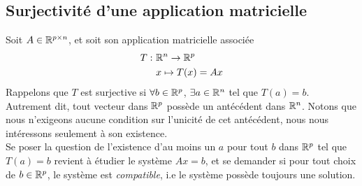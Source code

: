 \subsection{Surjectivité d'une application matricielle}
\noindent Soit $A \in \mathbb{R}^{p \times n}$, et soit son application matricielle associée
\begin{align*}
    T: \ &\mathbb{R}^n \to \mathbb{R}^p\\
    &x \mapsto T(x) = Ax
\end{align*}
Rappelons que $T$ est surjective si $\forall b \in \mathbb{R}^p$, $\exists a \in \mathbb{R}^n$ tel que $T(a)=b$. Autrement dit, tout vecteur dans $\mathbb{R}^p$ possède un antécédent dans $\mathbb{R}^n$. Notons que nous n'exigeons aucune condition sur l'unicité de cet antécédent, nous nous intéressons seulement à son existence. \\

\noindent Se poser la question de l'existence d'au moins un $a$ pour tout $b$ dans $\mathbb{R}^p$ tel que $T(a)=b$ revient à étudier le système $Ax=b$, et se demander si pour tout choix de $b \in \mathbb{R}^p$, le système est \textit{compatible}, i.e le système possède toujours une solution. \\

